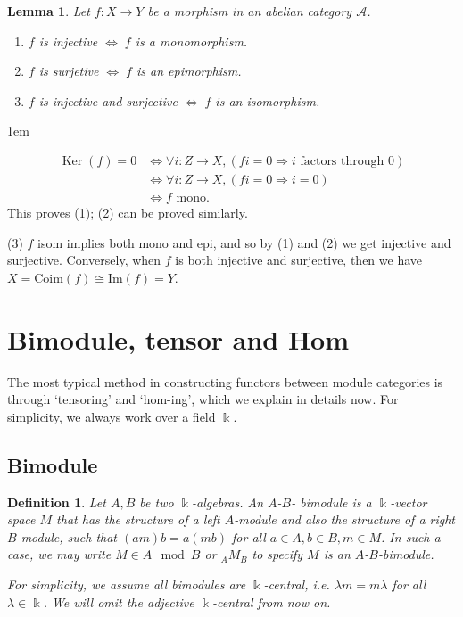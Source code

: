 \documentclass[11pt,a4paper]{article}
\makeatletter
\numberwithin{equation}{section}
\renewenvironment{proof}[1][\proofname]{\par
    \pushQED{\qed}%
    \normalfont \topsep0\p@\@plus6\p@ \labelsep1em\relax
    \trivlist
    \item[\hskip\labelsep\indent
        \bfseries #1]\ignorespaces
    \mbox{}
}{
    \popQED\endtrivlist\@endpefalse
}
\theoremstyle{all}
\newtheorem{lemma}[theorem]{Lemma}
\newtheorem{definition}[theorem]{Definition}
\theoremstyle{remark}
\newcommand{\Ker}{\operatorname{Ker}\nolimits}
\newcommand{\defn}[1]{\textsl{\color{darkblue} #1}}
\makeatother
\begin{document}
\begin{lemma}
Let $f:X\to Y$ be a morphism in an abelian category $\mathcal{A}$.
\begin{enumerate}
\item $f$ is injective $\Leftrightarrow\; f$ is a monomorphism.
\item $f$ is surjetive $\Leftrightarrow\; f$ is an epimorphism.
\item $f$ is injective and surjective $\Leftrightarrow\; f$ is an isomorphism.
\end{enumerate}
\end{lemma}
\begin{proof}
\begin{align*}
\Ker(f)=0 &\Leftrightarrow \forall i:Z\to X, ( fi=0 \Rightarrow i \text{ factors through } 0 ) \\
&\Leftrightarrow \forall i:Z\to X, ( fi=0 \Rightarrow i=0 ) \\
& \Leftrightarrow f \text{ mono.}
\end{align*}
This proves (1); (2) can be proved similarly.

(3) $f$ isom implies both mono and epi, and so by (1) and (2) we get injective and surjective.  Conversely, when $f$ is both injective and surjective, then we have $X= \mathrm{Coim}(f)\cong \mathrm{Im}(f) = Y$.
\end{proof}



\pagebreak


\section{Bimodule, tensor and Hom}

The most typical method in constructing functors between module categories is through `tensoring' and `hom-ing', which we explain in details now.  For simplicity, we always work over a field $\Bbbk$.

\subsection{Bimodule}
\begin{definition}
Let $A,B$ be two $\Bbbk$-algebras.
An $A$-$B$-\defn{bimodule} is a $\Bbbk$-vector space $M$ that has the structure of a left $A$-module and also the structure of a right $B$-module, such that $(am)b=a(mb)$ for all $a\in A, b\in B, m\in M$.
In such a case, we may write $M\in A\mod B$ or ${}_AM_B$ to specify $M$ is an $A$-$B$-bimodule.

For simplicity, we assume all bimodules are \defn{$\Bbbk$-central}, i.e. $\lambda m=m\lambda$ for all $\lambda\in\Bbbk$.  We will omit the adjective $\Bbbk$-central from now on.
\end{definition}
\end{document}
